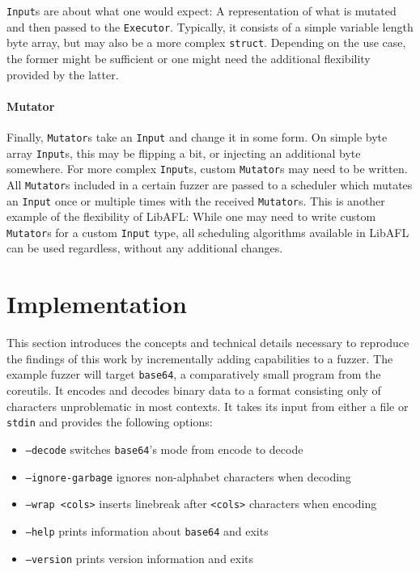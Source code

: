 \documentclass{article}
\newcommand{\code}[1]{\texttt{#1}}
\begin{document}
\begin{multicols}{2}
    \code{Input}s are about what one would expect: A representation of what is mutated and then passed to the \code{Executor}. Typically, it consists of a simple variable length byte array, but may also be a more complex \code{struct}. Depending on the use case, the former might be sufficient or one might need the additional flexibility provided by the latter.

    \paragraph{Mutator}

    Finally, \code{Mutator}s take an \code{Input} and change it in some form. On simple byte array \code{Input}s, this may be flipping a bit, or injecting an additional byte somewhere. For more complex \code{Input}s, custom \code{Mutator}s may need to be written. All \code{Mutator}s included in a certain fuzzer are passed to a scheduler which mutates an \code{Input} once or multiple times with the received \code{Mutator}s. This is another example of the flexibility of LibAFL: While one may need to write custom \code{Mutator}s for a custom \code{Input} type, all scheduling algorithms available in LibAFL can be used regardless, without any additional changes.

    \section{Implementation}

    This section introduces the concepts and technical details necessary to reproduce the findings of this work by incrementally adding capabilities to a fuzzer. The example fuzzer will target \code{base64}, a comparatively small program from the coreutils. It encodes and decodes binary data to a format consisting only of characters unproblematic in most contexts. It takes its input from either a file or \code{stdin} and provides the following options:
    \begin{itemize}
        \item \code{--decode} switches \code{base64}'s mode from encode to decode
        \item \code{--ignore-garbage} ignores non-alphabet characters when decoding
        \item \code{--wrap <cols>} inserts linebreak after \code{<cols>} characters when encoding
        \item \code{--help} prints information about \code{base64} and exits
        \item \code{--version} prints version information and exits
    \end{itemize}


\end{multicols}
\end{document}
